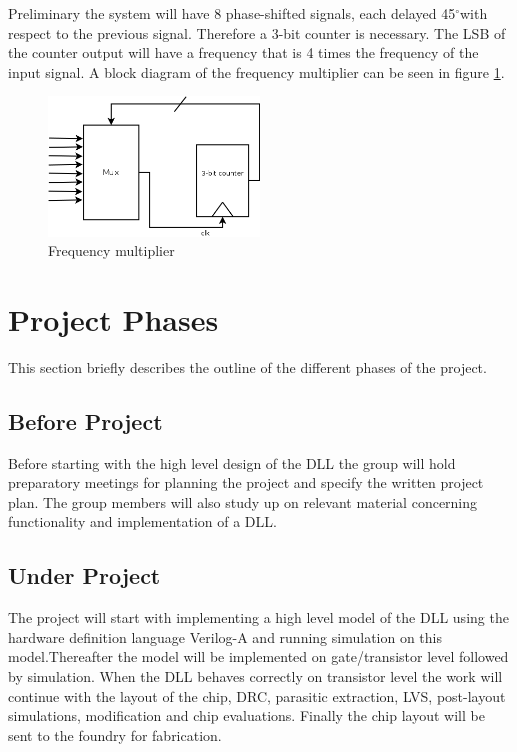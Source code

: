 \documentclass[a4paper,12pt]{article} \usepackage{graphicx}
\newcommand{\degree}{\ensuremath{^\circ}}
\begin{document}
Preliminary the system will have 8 phase-shifted signals, 
each delayed 45\degree with respect to the previous signal.
Therefore a 3-bit counter is necessary. The LSB of the counter output will 
have a frequency that is 4 times the frequency of the input signal.
A block diagram of the frequency multiplier can be seen in 
figure \ref{fig:freq_mult}.

\begin{figure}[h!]
        \centering
        \includegraphics[width=0.5\textwidth]{freq_mult.png}
        \caption{Frequency multiplier}
        \label{fig:freq_mult}
\end{figure}

\section{Project Phases} 
This section briefly describes the outline of the different phases of the
project.
\subsection{Before Project}
Before starting with the high level design of the DLL the group will hold
preparatory meetings for planning the project and specify the written project
plan. The group members will also study up on relevant material concerning
functionality and implementation of a DLL.
  
\subsection{Under Project}
The project will start with implementing a high level model of the DLL using
the hardware definition language Verilog-A and running simulation on this
model.Thereafter the model will be implemented on gate/transistor level followed by
simulation. When the DLL behaves correctly on transistor level the work will
continue with the layout of the chip, DRC, parasitic extraction, LVS,
post-layout simulations, modification and chip evaluations. Finally the chip
layout will be sent to the foundry for fabrication.
\end{document}
